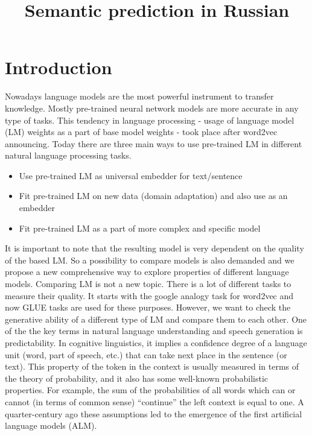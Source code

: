 \documentclass[a4paper]{article}
\title{Semantic prediction in {R}ussian}
\begin{document}
\maketitleabstract

\nocite{*}


\section{Introduction}

Nowadays language models are the most powerful instrument to transfer knowledge. Mostly pre-trained neural network models are more accurate in any type of tasks. This tendency in language processing - usage of language model (LM) weights as a part of base model weights - took place after word2vec announcing. Today there are three main ways to use pre-trained LM in different natural language processing tasks. 
\begin{itemize}
	\item Use pre-trained LM as universal embedder for text/sentence
	\item Fit pre-trained LM on new data (domain adaptation) and also use as an embedder
	\item Fit pre-trained LM as a part of more complex and specific model
\end{itemize}
It is important to note that the resulting model is very dependent on the quality of the based LM. So a possibility to compare models is also demanded and we propose a new comprehensive way to explore properties of different language models.
Comparing LM is not a new topic. There is a lot of different tasks to measure their quality. It starts with the google analogy task for word2vec \cite{mikolov2013efficient} and now GLUE tasks\cite{wang2018glue} are used for these purposes. However, we want to check the generative ability of a different type of LM and compare them to each other.
One of the the key terms in natural language understanding and speech generation is predictability. In cognitive linguistics, it implies a confidence degree of a language unit (word, part of speech, etc.) that can take next place in the sentence (or text). This property of the token in the context is usually measured in terms of the theory of probability, and it also has some well-known probabilistic properties. For example, the sum of the probabilities of all words which can or cannot (in terms of common sense) “continue” the left context is equal to one. A quarter-century ago these assumptions led to the emergence of the first artificial language models (ALM).
\end{document}
